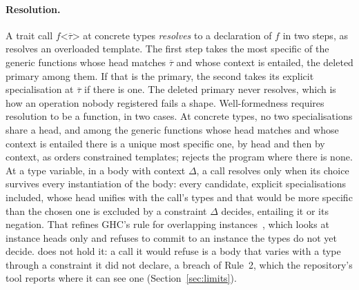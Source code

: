 \paragraph{Resolution.}
A trait call $f\texttt{<}\overline{\tau}\texttt{>}$ at concrete types \emph{resolves} to a declaration of $f$ in two steps, as \Cpp{} resolves an overloaded template.
The first step takes the most specific of the generic functions whose head matches $\overline{\tau}$ and whose context is entailed, the deleted primary among them.
If that is the primary, the second takes its explicit specialisation at $\overline{\tau}$ if there is one.
The deleted primary never resolves, which is how an operation nobody registered fails a shape.
Well-formedness requires resolution to be a function, in two cases.
At concrete types, no two specialisations share a head, and among the generic functions whose head matches and whose context is entailed there is a unique most specific one, by head and then by context, as \Cpp{} orders constrained templates; \Cpp{} rejects the program where there is none.
At a type variable, in a body with context $\Delta$, a call resolves only when its choice survives every instantiation of the body: every candidate, explicit specialisations included, whose head unifies with the call's types and that would be more specific than the chosen one is excluded by a constraint $\Delta$ decides, entailing it or its negation.
That refines GHC's rule for overlapping instances~\cite{ghc2024overlapping}, which looks at instance heads only and refuses to commit to an instance the types do not yet decide.
\Cpp{} does not hold it: a call it would refuse is a body that varies with a type through a constraint it did not declare, a breach of Rule~2, which the repository's tool reports where it can see one (Section~\ref{sec:limits}).

